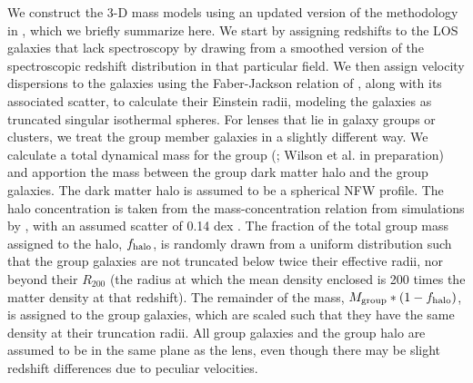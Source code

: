 We construct the 3-D mass models using an updated version of the methodology in \citet{Wong11}, which we briefly summarize here.  We start by assigning redshifts to the LOS galaxies that lack spectroscopy by drawing from a smoothed version of the spectroscopic redshift distribution in that particular field.  We then assign velocity dispersions to the galaxies using the Faber-Jackson relation of \citet{Bernardi03}, along with its associated scatter, to calculate their Einstein radii, modeling the galaxies as truncated singular isothermal spheres.  For lenses that lie in galaxy groups or clusters, we treat the group member galaxies in a slightly different way.  We calculate a total dynamical mass for the group (\citealt{Momcheva06}; Wilson et al. in preparation) and apportion the mass between the group dark matter halo and the group galaxies.  The dark matter halo is assumed to be a spherical NFW profile.  The halo concentration is taken from the mass-concentration relation from simulations by \citet{Zhao09}, with an assumed scatter of 0.14 dex \citep{Bullock01}.  The fraction of the total group mass assigned to the halo, $f_{\rm{halo}}$, is randomly drawn from a uniform distribution such that the group galaxies are not truncated below twice their effective radii, nor beyond their $R_{200}$ (the radius at which the mean density enclosed is 200 times the matter density at that redshift).  The remainder of the mass, $M_{\rm{group}}*(1-f_{\rm{halo}})$, is assigned to the group galaxies, which are scaled such that they have the same density at their truncation radii.  All group galaxies and the group halo are assumed to be in the same plane as the lens, even though there may be slight redshift differences due to peculiar velocities.
